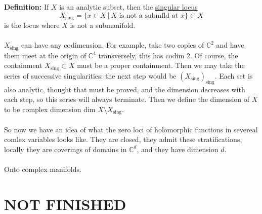 \documentclass[12pt]{report}
\theoremstyle{definition}
\theoremstyle{remark}
\numberwithin{equation}{section}
\theoremstyle{definition}
\newcommand{\bb}[1]{\mathbb{#1}}
\begin{document}
\textbf{Definition: }If $X$ is an analytic subset, then the \underline{singular locus} $$X_{\text{sing}} = \{x \in X\ |\ X \text{ is not a submfld at }x\} \subset X$$ is the locus where $X$ is not a submanifold. \\\\
$X_{\text{sing}}$ can have any codimension. For example, take two copies of $\bb C^2$ and have them meet at the origin of $\bb C^4$ transversely, this has codim 2. Of course, the containment $X_{\text{sing}} \subset X$ must be a proper containment. Then we may take the series of successive singularities: the next step would be $(X_{\text{sing}})_{{\text{sing}}}$. Each set is also analytic, thought that must be proved, and the dimension decreases with each step, so this series will always terminate. Then we define the dimension of $X$ to be complex dimension dim $X\setminus X_{\text{sing}}$.\\\\
So now we have an idea of what the zero loci of holomorphic functions in severeal comlex variables looks like. They are closed, they admit these stratifications, locally they are coverings of domains in $\bb C^d$, and they have dimension $d$. \\\\
Onto complex manifolds. 
\chapter{NOT FINISHED}
\end{document}
